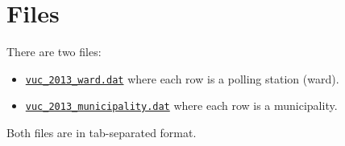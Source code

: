 \documentclass[11pt, a4paper]{article}
\begin{document}
\section{Files}

There are two files:
\begin{itemize}
	\item	\href{https://github.com/jmedzihorsky/vuc_2013/blob/master/data/vuc_2013_ward.dat}{\texttt{vuc\_2013\_ward.dat}} where each row is a polling station (ward).
	\item	\href{https://github.com/jmedzihorsky/vuc_2013/blob/master/data/vuc_2013_municipality.dat}{\texttt{vuc\_2013\_municipality.dat}} where each row is a municipality.		
\end{itemize}
Both files are in tab-separated format.
\end{document}
